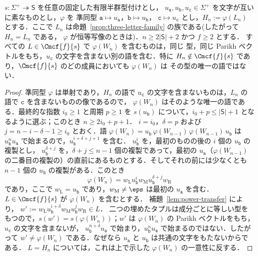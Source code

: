 \begin{theorem}[倍増族は持ち上がらない]
\label{thm:doubling-no-lift}
$s:\Sigma^+\twoheadrightarrow\mathsf S$ を任意の固定した有限半群型付けとし，
$u_{\mathtt a},u_{\mathtt b},u_{\mathtt c}\in\Sigma^+$ を文字が互いに素なものとし，$\varphi$ を
準同型 $\mathtt a\mapsto u_{\mathtt a}$，$\mathtt b\mapsto u_{\mathtt b}$，
$\mathtt c\mapsto u_{\mathtt c}$ とし，$H_n:=\varphi(L_n)$ とする．ここで
$L_n$ は命題~\ref{prop:three-letter-family} の族である\textup(したがって $H_n=L_n$ である，
$\varphi$ が恒等写像のときは\textup)．$n\ge2|\mathsf S|+2$ かつ $f\ge2$ とする．
すべての $L\in\Cmcf{f}{s}$ で $\varphi(W_n)$ を含むものは，同じ
型，同じ Parikh ベクトルをもち，$u_{\mathtt c}$ の文字を含まない別の語を含む．特に
$H_n\notin\Cmcf{f}{s}$ であり，$\Cmcf{f}{s}$ のどの成員においても $\varphi(W_n)$ は
その型の唯一の語ではない．
\end{theorem}
\begin{proof}
準同型 $\varphi$ は単射であり，$H_n$ の語で
$u_{\mathtt c}$ の文字を含まないものは，$L_n$ の語で $\mathtt c$ を含まないものの像であるので，
$\varphi(W_n)$ はそのような唯一の語である．最終的な指数 $i_0\ge1$ と周期
$p\ge1$ を $s(u_{\mathtt b})$ について，$i_0+p\le|\mathsf S|+1$ となるように選ぶ；このとき $n\ge2i_0+p+1$．
$i=i_0$，$\delta=p$ および $j=n-i-\delta-1\ge i_0$ とおく．語
$\varphi(W_n)=u_{\mathtt b}\,\varphi(W_{n-1})\,\varphi(W_{n-1})\,u_{\mathtt b}$ は
$u_{\mathtt b}^nu_{\mathtt a}$ で始まるので，$u_{\mathtt b}^{i+\delta+j+1}$ を含む．
$u_{\mathtt b}^i$ を，最初のものの後の $i$ 個の $u_{\mathtt b}$ の複製とし，
$u_{\mathtt b}^{\delta+j}$ を，$\delta+j\le n-1$ 個の複製であって，最初の
$u_{\mathtt a}$（$\varphi(W_{n-1})$ の二番目の複製の）の直前にあるものとする．そしてそれの前には少なくとも
$n-1$ 個の $u_{\mathtt b}$ の複製がある．このとき
\[
 \varphi(W_n)=w_{\mathrm L}u_{\mathtt b}^i w_{\mathrm M}u_{\mathtt b}^{\delta+j}w_{\mathrm R}
\]
であり，ここで $w_{\mathrm L}=u_{\mathtt b}$ であり，$w_{\mathrm M}\ne\eps$ は最初の
$u_{\mathtt a}$ を含む．$L\in\Cmcf{f}{s}$ が $\varphi(W_n)$ を含むとする．
補題~\ref{lem:power-transfer} により，
$w':=w_{\mathrm L}u_{\mathtt b}^{i+\delta}w_{\mathrm M}u_{\mathtt b}^jw_{\mathrm R}\in L$．
二つの埋めたタプルは成分ごとに等しい型をもつので，$s(w')=s(\varphi(W_n))$；$w'$ は
$\varphi(W_n)$ の Parikh ベクトルをもち，$u_{\mathtt c}$ の文字を含まないが，
$u_{\mathtt b}^{n+\delta}u_{\mathtt a}$ で始まり，$u_{\mathtt b}^nu_{\mathtt a}$ で始まるのではない．したがって
$w'\ne\varphi(W_n)$ である．なぜなら $u_{\mathtt a}$ と $u_{\mathtt b}$ は共通の文字をもたないからである．
$L=H_n$ については，これは上で示した $\varphi(W_n)$ の一意性に反する．
\end{proof}

